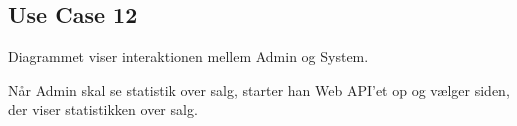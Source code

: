 \subsection{Use Case 12}
Diagrammet viser interaktionen mellem Admin og System.


Når Admin skal se statistik over salg, starter han Web API'et op og vælger siden, der viser statistikken over salg. 